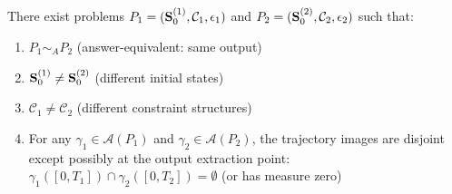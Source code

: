 \begin{theorem}
\label{thm:non_algo_equiv}
There exist problems $P_1 = (\mathbf{S}_0^{(1)}, \mathcal{C}_1, \epsilon_1)$ and $P_2 = (\mathbf{S}_0^{(2)}, \mathcal{C}_2, \epsilon_2)$ such that:
\begin{enumerate}
    \item $P_1 \sim_A P_2$ (answer-equivalent: same output)
    \item $\mathbf{S}_0^{(1)} \neq \mathbf{S}_0^{(2)}$ (different initial states)
    \item $\mathcal{C}_1 \neq \mathcal{C}_2$ (different constraint structures)
    \item For any $\gamma_1 \in \mathcal{A}(P_1)$ and $\gamma_2 \in \mathcal{A}(P_2)$, the trajectory images are disjoint except possibly at the output extraction point: $\gamma_1([0,T_1]) \cap \gamma_2([0,T_2]) = \emptyset$ (or has measure zero)
\end{enumerate}
\end{theorem}


